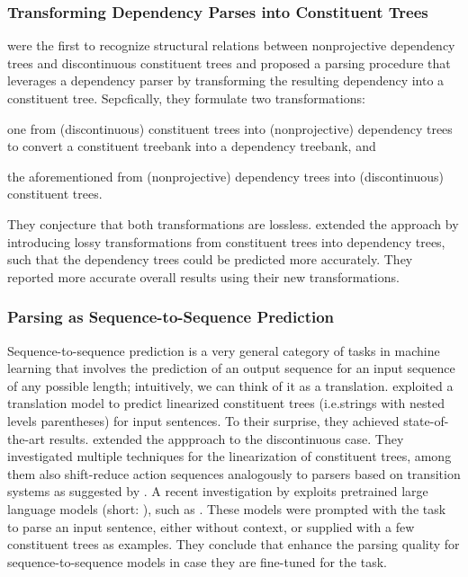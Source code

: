 \documentclass[../document.tex]{subfiles}
\begin{document}
    \subsubsection*{Transforming Dependency Parses into Constituent Trees}
    \citet{Hall08} were the first to recognize structural relations between nonprojective dependency trees and discontinuous constituent trees and proposed a parsing procedure that leverages a dependency parser by transforming the resulting dependency into a constituent tree.
    Sepcfically, they formulate two transformations:
    \begin{inparaenum}[]
        \item one from (discontinuous) constituent trees into (nonprojective) dependency trees to convert a constituent treebank into a dependency treebank, and
        \item the aforementioned from (nonprojective) dependency trees into (discontinuous) constituent trees.
    \end{inparaenum}
    They conjecture that both transformations are lossless.
    \citet{Ferandez15} extended the approach by introducing lossy transformations from constituent trees into dependency trees, such that the dependency trees could be predicted more accurately.
    They reported more accurate overall results using their new transformations.

    \subsubsection*{Parsing as Sequence-to-Sequence Prediction}
    Sequence-to-sequence prediction is a very general category of tasks in machine learning that involves the prediction of an output sequence for an input sequence of any possible length; intuitively, we can think of it as a translation.
    \citet{vinyals2015grammar} exploited a translation model to predict linearized constituent trees (i.e.\@ strings with nested levels parentheses) for input sentences.
    To their surprise, they achieved state-of-the-art results.
    \citet{FerGon21b} extended the appproach to the discontinuous case.
    They investigated multiple techniques for the linearization of constituent trees, among them also shift-reduce action sequences analogously to parsers based on transition systems as suggested by \citet{Ma2017DeterministicAF,liu-zhang-2017-encoder}.
    A recent investigation by \citet{bai2023constituency} exploits pretrained large language models (short: ), such as  \citep{openai2023gpt4}.
    These models were prompted with the task to parse an input sentence, either without context, or supplied with a few constituent trees as examples.
    They conclude that  enhance the parsing quality for sequence-to-sequence models in case they are fine-tuned for the task.
    
\end{document}
